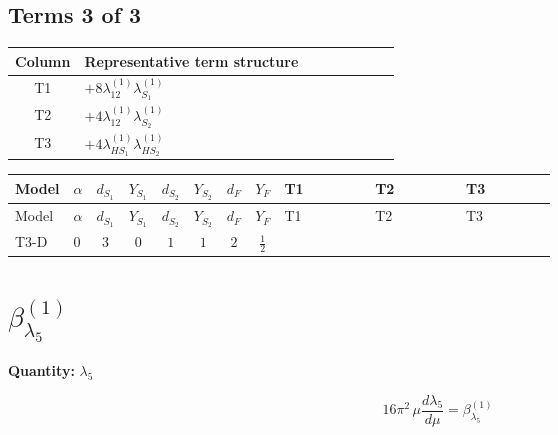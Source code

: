 \documentclass[8pt]{article}
\begin{document}
\begin{landscape}
\subsection*{Terms 3 of 3}
\begin{center}
\begin{tabular}{@{}c >{\raggedright\arraybackslash}p{0.82\linewidth}@{}}
\toprule
Column & Representative term structure \\
\midrule
T1 & \(\displaystyle +8 {\lambda_{12}^{(1)}} {\lambda_{S_1}^{(1)}}\) \\
\midrule
T2 & \(\displaystyle +4 {\lambda_{12}^{(1)}} {\lambda_{S_2}^{(1)}}\) \\
\midrule
T3 & \(\displaystyle +4 {\lambda_{HS_1}^{(1)}} {\lambda_{HS_2}^{(1)}}\) \\
\midrule
\bottomrule
\end{tabular}
\end{center}
\smallskip
\tiny
\begin{longtable}{@{}llcccccc >{\raggedright\arraybackslash}p{0.21\linewidth} >{\raggedright\arraybackslash}p{0.21\linewidth} >{\raggedright\arraybackslash}p{0.21\linewidth}@{}}
\toprule
Model & $\alpha$ & $d_{S_1}$ & $Y_{S_1}$ & $d_{S_2}$ & $Y_{S_2}$ & $d_F$ & $Y_F$ & T1 & T2 & T3 \\
\midrule
\endfirsthead
\toprule
Model & $\alpha$ & $d_{S_1}$ & $Y_{S_1}$ & $d_{S_2}$ & $Y_{S_2}$ & $d_F$ & $Y_F$ & T1 & T2 & T3 \\
\midrule
\endhead
T3-D & $0$ & $3$ & $0$ & $1$ & $1$ & $2$ & $\frac{1}{2}$ & \scriptsize\adjustbox{max width=\linewidth}{$\begin{gathered} +8 {\lambda_{12}^{(1)}} {\lambda_{S_1}^{(1)}}\end{gathered}$} & \scriptsize\adjustbox{max width=\linewidth}{$\begin{gathered} +4 {\lambda_{12}^{(1)}} {\lambda_{S_2}^{(1)}}\end{gathered}$} & \scriptsize\adjustbox{max width=\linewidth}{$\begin{gathered} +4 {\lambda_{HS_1}^{(1)}} {\lambda_{HS_2}^{(1)}}\end{gathered}$} \\
\midrule
\bottomrule
\end{longtable}
\clearpage
\section*{$\beta_{\lambda_5}^{(1)}$}
\noindent\textbf{Quantity: }$\lambda_5$\par\smallskip
\[16\pi^2\,\mu\frac{d \lambda_5}{d\mu}=\beta_{\lambda_5}^{(1)}\]

\end{landscape}
\end{document}
